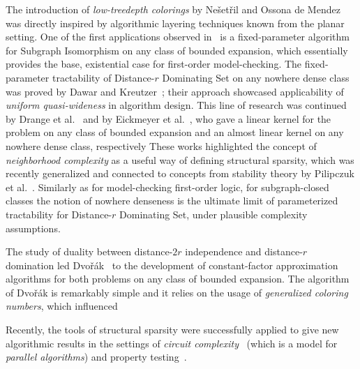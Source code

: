 The introduction of {\em{low-treedepth colorings}} by Ne\v{s}et\v{r}il and Ossona de Mendez~\cite{NesetrilM08a} was directly inspired by algorithmic layering techniques known from the planar setting.
One of the first applications observed in~\cite{NesetrilM08a} is a fixed-parameter algorithm for Subgraph Isomorphism on any class of bounded expansion, 
which essentially provides the base, existential case for first-order model-checking. 
The fixed-parameter tractability of Distance-$r$ Dominating Set on any nowhere dense class was proved by Dawar and Kreutzer~\cite{DawarK09}; 
their approach showcased applicability of {\em{uniform quasi-wideness}} in algorithm design.
This line of research was continued by Drange et al.~\cite{DrangeDFKLPPRVS16} and by Eickmeyer et al.~\cite{eickmeyer2016neighborhood}, who gave a linear kernel for the problem on any class of bounded expansion
and an almost linear kernel on any nowhere dense class, respectively
These works highlighted the concept of {\em{neighborhood complexity}} as a useful way of defining structural sparsity, 
which was recently generalized and connected to concepts from stability theory by Pilipczuk et al.~\cite{pilipczuk2018number}.
Similarly as for model-checking first-order logic, for subgraph-closed classes the notion of nowhere denseness is the ultimate limit of parameterized tractability for Distance-$r$ Dominating Set,
under plausible complexity assumptions.

The study of duality between distance-$2r$ independence and distance-$r$ domination led Dvo\v{r}\'ak~\cite{Dvorak13}
to the development of constant-factor approximation algorithms for both problems on any class of bounded expansion.
The algorithm of Dvo\v{r}\'ak is remarkably simple and it relies on the usage of {\em{generalized coloring numbers}}, which influenced


Recently, the tools of structural sparsity were successfully applied to give new algorithmic results in the settings of {\em{circuit complexity}}~\cite{PilipczukST18} 
(which is a model for {\em{parallel algorithms}}) and property testing~\cite{AdlerH18}.


